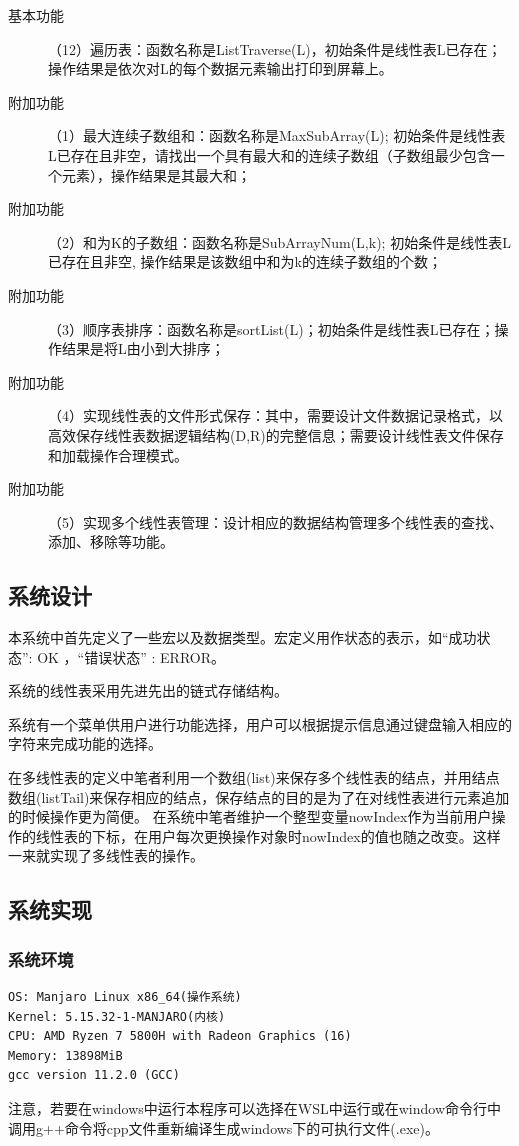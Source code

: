 \documentclass[supercite]{Experimental_Report}
\theoremstyle{definition}
\begin{document}
\begin{description}
	\item[基本功能] （12）遍历表：函数名称是ListTraverse(L)，初始条件是线性表L已存在；操作结果是依次对L的每个数据元素输出打印到屏幕上。\\ 
	\item[附加功能] （1）最大连续子数组和：函数名称是MaxSubArray(L); 初始条件是线性表L已存在且非空，请找出一个具有最大和的连续子数组（子数组最少包含一个元素），操作结果是其最大和；
	\item[附加功能] （2）和为K的子数组：函数名称是SubArrayNum(L,k); 初始条件是线性表L已存在且非空, 操作结果是该数组中和为k的连续子数组的个数；
	\item[附加功能] （3）顺序表排序：函数名称是sortList(L)；初始条件是线性表L已存在；操作结果是将L由小到大排序；
	\item[附加功能] （4）实现线性表的文件形式保存：其中，需要设计文件数据记录格式，以高效保存线性表数据逻辑结构(D,{R})的完整信息；需要设计线性表文件保存和加载操作合理模式。
	\item[附加功能] （5）实现多个线性表管理：设计相应的数据结构管理多个线性表的查找、添加、移除等功能。
\end{description}


\subsection{系统设计}
本系统中首先定义了一些宏以及数据类型。宏定义用作状态的表示，如“成功状态”: OK ，“错误状态” : ERROR。

系统的线性表采用先进先出的链式存储结构。

系统有一个菜单供用户进行功能选择，用户可以根据提示信息通过键盘输入相应的字符来完成功能的选择。

在多线性表的定义中笔者利用一个数组(list)来保存多个线性表的结点，并用结点数组(listTail)来保存相应的结点，保存结点的目的是为了在对线性表进行元素追加的时候操作更为简便。
在系统中笔者维护一个整型变量nowIndex作为当前用户操作的线性表的下标，在用户每次更换操作对象时nowIndex的值也随之改变。这样一来就实现了多线性表的操作。

\subsection{系统实现}

\subsubsection{系统环境}
\begin{verbatim}
OS: Manjaro Linux x86_64(操作系统) 
Kernel: 5.15.32-1-MANJARO(内核)
CPU: AMD Ryzen 7 5800H with Radeon Graphics (16) 
Memory: 13898MiB
gcc version 11.2.0 (GCC)
\end{verbatim}
注意，若要在windows中运行本程序可以选择在WSL中运行或在window命令行中调用g++命令将cpp文件重新编译生成windows下的可执行文件(.exe)。
\end{document}
